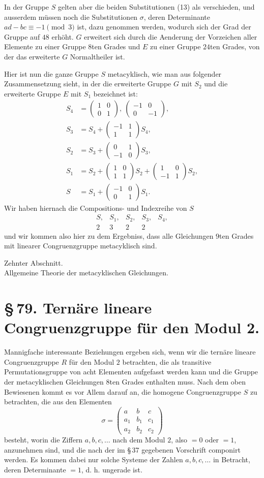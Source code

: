 \documentclass[11pt]{article}
\providecommand{\mat}[4]{\begin{pmatrix}#1&#2\\#3&#4\end{pmatrix}}
\providecommand{\mmat}[9]{\begin{pmatrix}#1&#2&#3\\#4&#5&#6\\#7&#8&#9\end{pmatrix}}
\providecommand{\mat}[4]{\begin{pmatrix}#1&#2\\#3&#4\end{pmatrix}}
\providecommand{\mmat}[9]{\begin{pmatrix}#1&#2&#3\\#4&#5&#6\\#7&#8&#9\end{pmatrix}}
\providecommand{\mat}[1]{\begin{pmatrix}#1\end{pmatrix}}
\begin{document}
In der Gruppe $S$ gelten aber die beiden Substitutionen (13) als verschieden, und ausserdem müssen noch die Substitutionen $\sigma$, deren Determinante $ad-bc\equiv -1\pmod 3$ ist, dazu genommen werden, wodurch sich der Grad der Gruppe auf $48$ erhöht. $G$ erweitert sich durch die Aenderung der Vorzeichen aller Elemente zu einer Gruppe $8$ten Grades und $E$ zu einer Gruppe $24$ten Grades, von der das erweiterte $G$ Normaltheiler ist.

Hier ist nun die ganze Gruppe $S$ metacyklisch, wie man aus folgender Zusammensetzung sieht, in der die erweiterte Gruppe $G$ mit $S_2$ und die erweiterte Gruppe $E$ mit $S_1$ bezeichnet ist:
\begin{align*}
 S_4&=\mat{1}{0}{0}{1},\ \mat{-1}{0}{0}{-1},\\
 S_3&=S_4+\mat{-1}{1}{1}{1}S_4,\\
 S_2&=S_3+\mat{0}{1}{-1}{0}S_3,\\
 S_1&=S_2+\mat{1}{0}{1}{1}S_2+\mat{1}{0}{-1}{1}S_2,\\
 S&=S_1+\mat{-1}{0}{0}{1}S_1.
\end{align*}
Wir haben hiernach die Compositions- und Indexreihe von $S$
\[
 \begin{array}{ccccc}
 S,&S_1,&S_2,&S_3,&S_4,\\
 2&3&2&2&
 \end{array}
\]
und wir kommen also hier zu dem Ergebniss, dass alle Gleichungen $9$ten Grades mit linearer Congruenzgruppe metacyklisch sind.




\begin{center}
{\large Zehnter Abschnitt.}\\[0.4em]
{\large Allgemeine Theorie der metacyklischen Gleichungen.}
\end{center}

\section*{\S\,79. Ternäre lineare Congruenzgruppe für den Modul 2.}

Mannigfache interessante Beziehungen ergeben sich, wenn wir die ternäre lineare Congruenzgruppe $R$ für den Modul $2$ betrachten, die als transitive Permutationsgruppe von acht Elementen aufgefasst werden kann und die Gruppe der metacyklischen Gleichungen $8$ten Grades enthalten muss. Nach dem oben Bewiesenen kommt es vor Allem darauf an, die homogene Congruenzgruppe $S$ zu betrachten, die aus den Elementen
\begin{equation}
 \sigma=\mmat{a}{b}{c}{a_1}{b_1}{c_1}{a_2}{b_2}{c_2}
 \tag{1}
\end{equation}
besteht, worin die Ziffern $a,b,c,\ldots$ nach dem Modul $2$, also $=0$ oder $=1$, anzunehmen sind, und die nach der im \S\,37 gegebenen Vorschrift componirt werden. Es kommen dabei nur solche Systeme der Zahlen $a,b,c,\ldots$ in Betracht, deren Determinante $=1$, d. h. ungerade ist.
\end{document}
